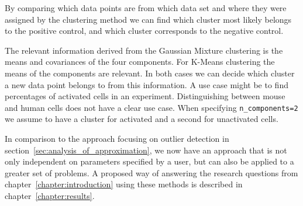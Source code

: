 By comparing which data points are from which data set and where they were assigned by the clustering method we can find which cluster most likely belongs to the positive control, and which cluster corresponds to the negative control.

The relevant information derived from the Gaussian Mixture clustering is the means and covariances of the four components. For K-Means clustering the means of the components are relevant. In both cases we can decide which cluster a new data point belongs to from this information. A use case might be to find percentages of activated cells in an experiment. Distinguishing between mouse and human cells does not have a clear use case. When specifying \texttt{n\_components=2} we assume to have a cluster for activated and a second for unactivated cells.

In comparison to the approach focusing on outlier detection in section~\ref{sec:analysis_of_approximation}, we now have an approach that is not only independent on parameters specified by a user, but can also be applied to a greater set of problems. A proposed way of answering the research questions from chapter~\ref{chapter:introduction} using these methods is described in chapter~\ref{chapter:results}.
